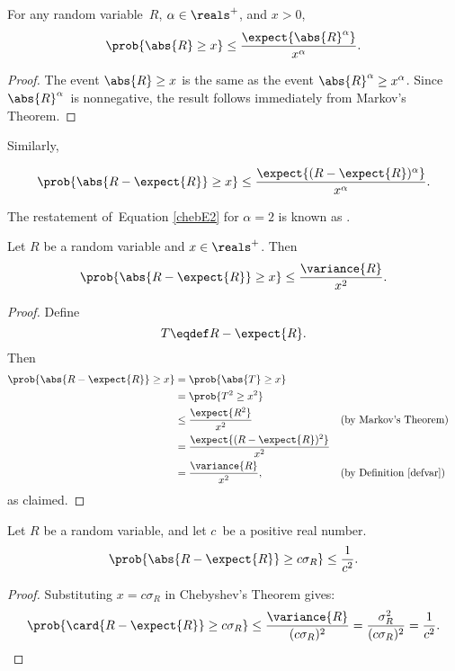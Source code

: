 \begin{lemma}\label{lem:Markov2}
For any random variable~$R$, $\alpha \in \reals^+$, and $x > 0$,
\[
\prob{\abs{R} \geq x} \leq \frac{\expect{\abs{R}^\alpha}}{x^\alpha}.
\]
\end{lemma}

\begin{proof}
The event $\abs{R} \ge x$ is the same as the event $\abs{R}^\alpha \ge
x^\alpha$.  Since $\abs{R}^\alpha$~is nonnegative, the result follows
immediately from Markov's Theorem.
\end{proof}

Similarly,

\begin{equation}\label{chebE2}
\prob{\abs{R - \expect{R}} \geq x}
    \leq \frac{\expect{(R - \expect{R})^\alpha}}{x^\alpha}.
\end{equation}

The restatement of~Equation \ref{chebE2} for $\alpha=2$ is known as
.
\begin{theorem}[Chebyshev]\label{chebthm}
  Let $R$ be a random variable and $x \in \reals^+$.  Then
\[
\prob{\abs{R - \expect{R}} \geq x} \leq \frac{\variance{R}}{x^2}.
\]
\end{theorem}

\begin{proof}

Define
\begin{equation*}
    T \eqdef R - \expect{R}.
\end{equation*}
Then
\begin{align*}
\prob{ \abs{R - \expect{R}} \ge x }
    &= \prob{\abs{T} \ge x} \\
     &= \prob{T^2 \ge x^2} \\
     &\le \frac{\expect{R^2}}{x^2} && \text{(by Markov's Theorem)} \\
     & = \frac{ \expect{ (R - \expect{R})^2 } }{x^2} \\
     &= \frac{\variance{R}}{x^2},  && \text{(by Definition~\ref{defvar})}
\end{align*}
as claimed.
\end{proof}


\begin{corollary}
\label{cor:cheby}
Let $R$ be a random variable, and let $c$~be a positive real number.
\[
\prob{\abs{R - \expect{R}} \geq c \sigma_R} \leq \frac{1}{c^2}.
\]
\end{corollary}

\begin{proof}
  Substituting $x = c \sigma_R$ in Chebyshev's Theorem gives:
  \begin{equation*}
    \prob{\card{R - \expect{R}} \geq c \sigma_R}
    \leq
    \frac{\variance{R}}{(c \sigma_R)^2}
    =  \frac{\sigma_R^2}{(c \sigma_R)^2}
    = \frac{1}{c^2}.\qedhere
  \end{equation*}
\end{proof}

